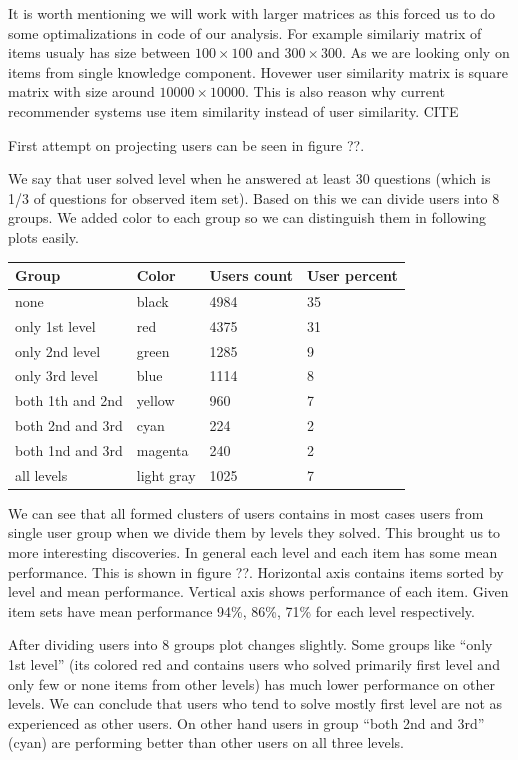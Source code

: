 \documentclass[
  digital, %
  table,   %
  nolof,     %
  nolot,     %
  nocover
]{fithesis3}
\begin{document}
It is worth mentioning we will work with larger matrices as this forced
us to do some optimalizations in code of our analysis. For example
similariy matrix of items usualy has size between $100\times 100$ and
$300\times 300$. As we are looking only on items from single knowledge
component. Hovewer user similarity matrix is square matrix with size
around $10 000\times 10 000$. This is also reason why current
recommender systems use item similarity instead of user similarity. CITE

First attempt on projecting users can be seen in figure ??.


We say that user solved level when he answered at least 30 questions
(which is 1/3 of questions for observed item set). Based on this we can
divide users into 8 groups. We added color to each group so we can
distinguish them in following plots easily.

\begin{center}
  \begin{tabular}{ | l | l | l | l | }
  \hline
  	Group & Color & Users count & User percent \\ \hline
  	none & black & 4984 & 35 \\ \hline
  	only 1st level & red & 4375 & 31 \\ \hline
  	only 2nd level & green & 1285 & 9 \\ \hline
  	only 3rd level & blue & 1114 & 8 \\ \hline
  	both 1th and 2nd & yellow & 960 & 7 \\ \hline
  	both 2nd and 3rd & cyan & 224 & 2 \\ \hline
  	both 1nd and 3rd & magenta & 240 & 2 \\ \hline
  	all levels & light gray & 1025 & 7 \\ \hline
  \end{tabular}
\end{center}


We can see that all formed clusters of users contains in most cases users
from single user group when we divide them by levels they solved. This
brought us to more interesting discoveries. In general each level and
each item has some mean performance. This is shown in figure ??.
Horizontal axis contains items sorted by level and mean performance.
Vertical axis shows performance of each item. Given item sets have mean
performance 94\%, 86\%, 71\% for each level respectively.

After dividing users into 8 groups plot changes slightly. Some groups
like ``only 1st level'' (its colored red and contains users who solved
primarily first level and only few or none items from other levels) has
much lower performance on other levels. We can conclude that users who
tend to solve mostly first level are not as experienced as other users. On
other hand users in group ``both 2nd and 3rd'' (cyan) are performing
better than other users on all three levels.
\end{document}
